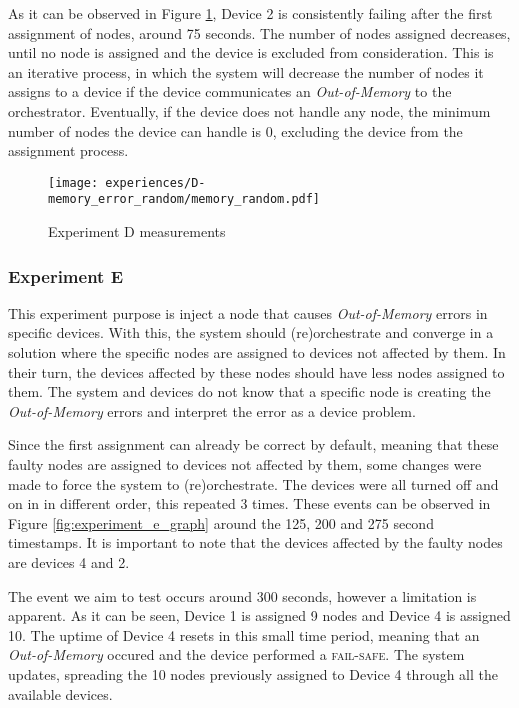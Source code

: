 As it can be observed in Figure \ref{fig:experiment_d_graph}, Device 2 is consistently failing after the first assignment of nodes, around 75 seconds. The number of nodes assigned decreases, until no node is assigned and the device is excluded from consideration. This is an iterative process, in which the system will decrease the number of nodes it assigns to a device if the device communicates an \textit{Out-of-Memory} to the orchestrator. Eventually, if the device does not handle any node, the minimum number of nodes the device can handle is 0, excluding the device from the assignment process.

\begin{figure}[h]
\centering
\texttt{[image: experiences/D-memory\_error\_random/memory\_random.pdf]}
\caption[Experiment D measurements]{Experiment D measurements}\label{fig:experiment_d_graph}
\end{figure}


\subsubsection{Experiment E}

This experiment purpose is inject a node that causes \textit{Out-of-Memory} errors in specific devices. With this, the system should (re)orchestrate and converge in a solution where the specific nodes are assigned to devices not affected by them. In their turn, the devices affected by these nodes should have less nodes assigned to them. The system and devices do not know that a specific node is creating the \textit{Out-of-Memory} errors and interpret the error as a device problem.

Since the first assignment can already be correct by default, meaning that these faulty nodes are assigned to devices not affected by them, some changes were made to force the system to (re)orchestrate. The devices were all turned off and on in in different order, this repeated 3 times. These events can be observed in Figure \ref{fig:experiment_e_graph} around the 125, 200 and 275 second timestamps. It is important to note that the devices affected by the faulty nodes are devices 4 and 2.

The event we aim to test occurs around 300 seconds, however a limitation is apparent. As it can be seen, Device 1 is assigned 9 nodes and Device 4 is assigned 10. The uptime of Device 4 resets in this small time period, meaning that an \textit{Out-of-Memory} occured and the device performed a \textsc{fail-safe}. The system updates, spreading the 10 nodes previously assigned to Device 4 through all the available devices. 

